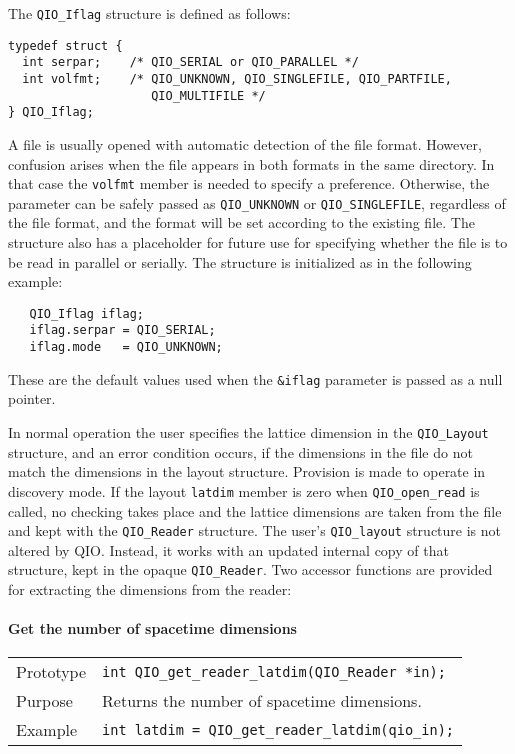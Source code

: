 \documentclass{article}
\begin{document}
The \verb|QIO_Iflag| structure is defined as follows:
%
%
\begin{verbatim}
typedef struct {
  int serpar;    /* QIO_SERIAL or QIO_PARALLEL */
  int volfmt;    /* QIO_UNKNOWN, QIO_SINGLEFILE, QIO_PARTFILE, 
                    QIO_MULTIFILE */
} QIO_Iflag;
\end{verbatim}
%

A file is usually opened with automatic detection of the file format.
However, confusion arises when the file appears in both formats in the
same directory.  In that case the \verb|volfmt| member is needed to
specify a preference.  Otherwise, the parameter can be safely passed
as \verb|QIO_UNKNOWN| or \verb|QIO_SINGLEFILE|, regardless of the file
format, and the format will be set according to the existing file.
The structure also has a placeholder for future use for specifying
whether the file is to be read in parallel or serially.  The structure
is initialized as in the following example:

%
\begin{verbatim}
   QIO_Iflag iflag;
   iflag.serpar = QIO_SERIAL;
   iflag.mode   = QIO_UNKNOWN;
\end{verbatim}
%
These are the default values used when the \verb|&iflag| parameter is
passed as a null pointer.


In normal operation the user specifies the lattice dimension in the
\verb|QIO_Layout| structure, and an error condition occurs, if the
dimensions in the file do not match the dimensions in the layout
structure.  Provision is made to operate in discovery mode.  If the
layout \verb|latdim| member is zero when \verb|QIO_open_read| is
called, no checking takes place and the lattice dimensions are taken
from the file and kept with the \verb|QIO_Reader| structure.  The
user's \verb|QIO_layout| structure is not altered by QIO\@.  Instead,
it works with an updated internal copy of that structure, kept in the
opaque \verb|QIO_Reader|.  Two accessor functions are provided for
extracting the dimensions from the reader:

\paragraph{Get the number of spacetime dimensions}

\begin{flushleft}
  \begin{tabular}{|l|l|}
  \hline
  Prototype      & \verb|int QIO_get_reader_latdim(QIO_Reader *in);| \\
  Purpose        & Returns the number of spacetime dimensions. \\
\hline
  Example  & \verb|int latdim = QIO_get_reader_latdim(qio_in);|\\
   \hline
 \end{tabular}
\end{flushleft}
%
\end{document}
